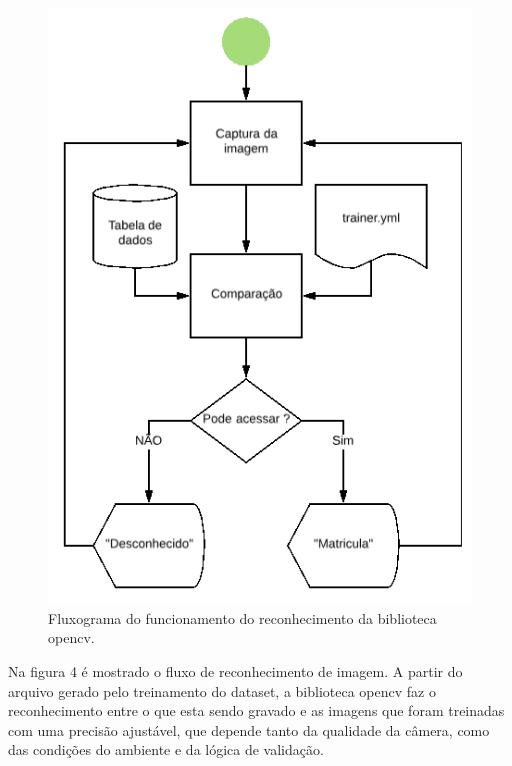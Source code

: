 \documentclass[conference,compsoc]{IEEEtran}
\begin{document}
\begin{figure}[!ht]
		\centering
		\includegraphics[scale=0.25]{Reconehcimento.png}
		\caption{Fluxograma do funcionamento do reconhecimento da biblioteca opencv.}
\end{figure}

Na figura 4 é mostrado o fluxo de reconhecimento de imagem. A partir do arquivo gerado pelo treinamento do dataset, a biblioteca opencv faz o reconhecimento entre o que esta sendo gravado e as imagens que foram treinadas com uma precisão ajustável, que depende tanto da qualidade da câmera, como das condições do ambiente e da lógica de validação. 
\end{document}
